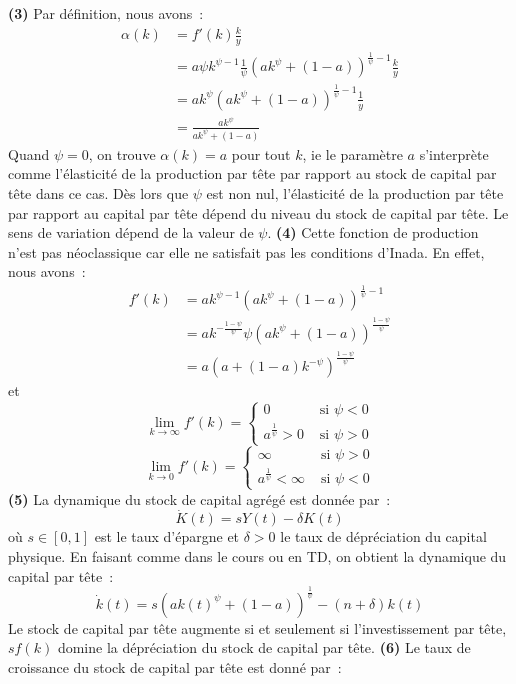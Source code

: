\documentclass[11pt,a4paper,notitlepage]{article}
\begin{document}
\textbf{(3)} Par définition, nous avons :
\[
  \begin{split}
    \alpha(k) &= f'(k)\frac{k}{y}\\
    &= a\psi k^{\psi-1}\frac{1}{\psi}\left(ak^{\psi} + (1-a)\right)^{\frac{1}{\psi}-1}\frac{k}{y}\\
    &= ak^{\psi}\left(ak^{\psi} + (1-a)\right)^{\frac{1}{\psi}-1}\frac{1}{y}\\
    &= \frac{ak^{\psi}}{ak^{\psi} + (1-a)}
  \end{split}
\]
Quand $\psi=0$, on trouve $\alpha(k)=a$ pour tout $k$, ie le paramètre $a$ s'interprète comme l'élasticité de la production par tête par rapport au stock de capital par tête dans ce cas. Dès lors que $\psi$ est non nul, l'élasticité de la production par tête par rapport au capital par tête dépend du niveau du stock de capital par tête. Le sens de variation dépend de la valeur de $\psi$. \textbf{(4)} Cette fonction de production n'est pas néoclassique car elle ne satisfait pas les conditions d'Inada. En effet, nous avons :
\[
  \begin{split}
    f'(k) &= a k^{\psi-1}\left(ak^{\psi} + (1-a)\right)^{\frac{1}{\psi}-1}\\
    &= a k^{-\frac{1-\psi}{\psi}}\psi\left(ak^{\psi} + (1-a)\right)^{\frac{1-\psi}{\psi}}\\
    &= a \left(a + (1-a)k^{-\psi}\right)^{\frac{1-\psi}{\psi}}
  \end{split}
\]
et
\[
\lim_{k\rightarrow\infty} f'(k) =
\begin{cases}
  0 &\text{ si } \psi<0\\
  a^{\frac{1}{\psi}}>0&\text{ si }\psi>0
\end{cases}
\]
\[
\lim_{k\rightarrow 0} f'(k) =
\begin{cases}
  \infty &\text{ si } \psi>0\\
  a^{\frac{1}{\psi}}<\infty&\text{ si }\psi<0
\end{cases}
\]
\textbf{(5)} La dynamique du stock de capital agrégé est donnée par :
\[
\dot K(t) = sY(t)-\delta K(t)
\]
où $s\in[0,1]$ est le taux d'épargne et $\delta>0$ le taux de dépréciation du capital physique. En faisant comme dans le cours ou en TD, on obtient la dynamique du capital par tête :
\[
\dot k(t) = s \left(ak(t)^{\psi} + (1-a)\right)^{\frac{1}{\psi}} - (n+\delta)k(t)
\]
Le stock de capital par tête augmente si et seulement si l'investissement par tête, $sf(k)$ domine la dépréciation du stock de capital par tête. \textbf{(6)} Le taux de croissance du stock de capital par tête est donné par :
\end{document}
